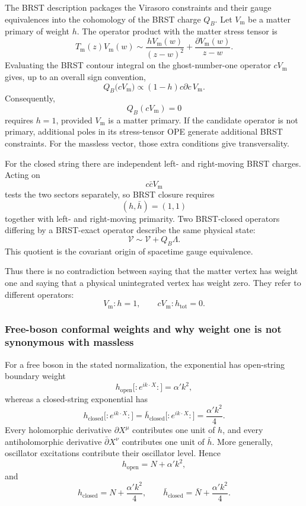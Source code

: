 \documentclass[
  10pt,
  a4paper,
  openany]{book}
\begin{document}
The BRST description packages the Virasoro constraints and their gauge
equivalences into the cohomology of the BRST charge \(Q_B\). Let
\(V_{\mathrm m}\) be a matter primary of weight \(h\). The operator
product with the matter stress tensor is \[
T_{\mathrm m}(z)V_{\mathrm m}(w)
\sim
\frac{hV_{\mathrm m}(w)}{(z-w)^2}
+\frac{\partial V_{\mathrm m}(w)}{z-w}.
\] Evaluating the BRST contour integral on the ghost-number-one operator
\(cV_{\mathrm m}\) gives, up to an overall sign convention, \[
Q_B\bigl(cV_{\mathrm m}\bigr)
\propto
(1-h)c\partial c\,V_{\mathrm m}.
\] Consequently, \[
Q_B(cV_{\mathrm m})=0
\] requires \(h=1\), provided \(V_{\mathrm m}\) is a matter primary. If
the candidate operator is not primary, additional poles in its
stress-tensor OPE generate additional BRST constraints. For the massless
vector, those extra conditions give transversality.

For the closed string there are independent left- and right-moving BRST
charges. Acting on \[
c\bar cV_{\mathrm m}
\] tests the two sectors separately, so BRST closure requires \[
(h,\bar h)=(1,1)
\] together with left- and right-moving primarity. Two BRST-closed
operators differing by a BRST-exact operator describe the same physical
state: \[
\mathcal V\sim\mathcal V+Q_B\Lambda.
\] This quotient is the covariant origin of spacetime gauge equivalence.

Thus there is no contradiction between saying that the matter vertex has
weight one and saying that a physical unintegrated vertex has weight
zero. They refer to different operators: \[
V_{\mathrm m}: h=1,
\qquad
cV_{\mathrm m}: h_{\mathrm{tot}}=0.
\]

\subsubsection{Free-boson conformal weights and why weight one is not
synonymous with
massless}\label{free-boson-conformal-weights-and-why-weight-one-is-not-synonymous-with-massless}

For a free boson in the stated normalization, the exponential has
open-string boundary weight \[
h_{\mathrm{open}}\bigl[:e^{ik\cdot X}:\bigr]=\alpha'k^2,
\] whereas a closed-string exponential has \[
h_{\mathrm{closed}}\bigl[:e^{ik\cdot X}:\bigr]
=\bar h_{\mathrm{closed}}\bigl[:e^{ik\cdot X}:\bigr]
=\frac{\alpha'k^2}{4}.
\] Every holomorphic derivative \(\partial X^\mu\) contributes one unit
of \(h\), and every antiholomorphic derivative \(\bar\partial X^\nu\)
contributes one unit of \(\bar h\). More generally, oscillator
excitations contribute their oscillator level. Hence \[
h_{\mathrm{open}}=N+\alpha'k^2,
\] and \[
h_{\mathrm{closed}}=N+\frac{\alpha'k^2}{4},
\qquad
\bar h_{\mathrm{closed}}=\bar N+\frac{\alpha'k^2}{4}.
\]
\end{document}

